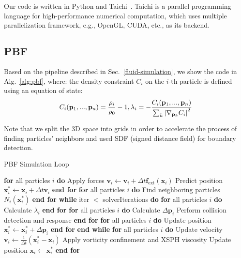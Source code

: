 \documentclass[sigconf]{acmart}
\begin{document}
Our code is written in Python and Taichi~\cite{hu2019taichi, hu2019difftaichi, hu2021quantaichi}. Taichi is a parallel programming language for high-performance numerical computation, which uses multiple parallelization framework, e.g., OpenGL, CUDA, etc., as its backend.

\subsection{PBF}
Based on the pipeline described in Sec.~\ref{fluid-simulation}, we show the code in Alg.~\ref{alg:pbf}, where:
the density constraint $C_i$ on the $i$-th particle is defined using an equation of state: 
 \begin{equation}
     C_{i}(\mathbf{p}_{1},...,\mathbf{p}_{n})=\frac{\rho_{i}}{\rho_{0}}-1, \\
     \lambda_{i}=-\frac{C_{i}(\mathbf{p}_{1},...,\mathbf{p}_{n})}{\sum_{k}\left|\nabla_{{\mathbf{p}_{k}}}C_{i}\right|^{2}}
 \end{equation}
 
Note that we split the 3D space into grids in order to accelerate the process of finding particles' neighbors and used SDF (signed distance field) for boundary detection.
\begin{algorithm}
\caption{PBF Simulation Loop}
\begin{algorithmic}[1]
\State \textbf{for} all particles $i$ \textbf{do}
\State \quad Apply forces $\mathbf{v}_i \leftarrow \mathbf{v}_i + \Delta t \mathbf{f}_{\text{ext}}(\mathbf{x}_i)$ 
\State \quad Predict position $\mathbf{x}^*_i \leftarrow \mathbf{x}_i + \Delta t \mathbf{v}_i$
\State \textbf{end for}
\State \textbf{for} all particles $i$ \textbf{do}
\State \quad Find neighboring particles $N_i(\mathbf{x}^*_i)$
\State \textbf{end for}
\State \textbf{while} iter $<$ solverIterations \textbf{do} 
\State \quad \textbf{for} all particles $i$ \textbf{do}
\State \quad \quad Calculate $\lambda_i$
\State \quad \textbf{end for}
\State \quad \textbf{for} all particles $i$ \textbf{do}
\State \quad \quad Calculate $\Delta \mathbf{p}_i$
\State \quad \quad Perform collision detection and response
\State \quad \textbf{end for}
\State \quad \textbf{for} all particles $i$ \textbf{do}
\State \quad \quad Update position $\mathbf{x}^*_i \leftarrow \mathbf{x}^*_i + \Delta \mathbf{p}_i$
\State \quad \textbf{end for}
\State \textbf{end while}
\State \textbf{for} all particles $i$ \textbf{do}
\State \quad Update velocity $\mathbf{v}_i \leftarrow \frac{1}{\Delta t} (\mathbf{x}^*_i - \mathbf{x}_i)$
\State \quad Apply vorticity confinement and XSPH viscosity
\State \quad Update position $\mathbf{x}_i \leftarrow \mathbf{x}^*_i$
\State \textbf{end for}
\end{algorithmic}
\label{alg:pbf}
\end{algorithm}
\end{document}
